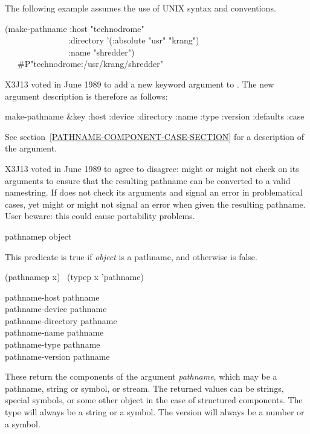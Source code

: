 \begin{newer}
The following example assumes the use of UNIX syntax and conventions.
\begin{lisp}
(make-pathname :host "technodrome" \\
~~~~~~~~~~~~~~~:directory '(:absolute "usr" "krang") \\
~~~~~~~~~~~~~~~:name "shredder") \\
~~\EV\ \#P"technodrome:/usr/krang/shredder"
\end{lisp}
X3J13 voted in June 1989  to add a new keyword
argument  to .  The new argument description
is therefore as follows:

\begin{defun}[Function]
make-pathname &key :host :device :directory :name :type :version :defaults :case

See section~\ref{PATHNAME-COMPONENT-CASE-SECTION} for a description
of the  argument.

X3J13 voted in June 1989  to agree to disagree:
 might or might not check
on its arguments to ensure that the resulting pathname can be converted to
a valid namestring.  If  does not check its arguments
and signal an error in problematical cases,
 yet might or might not signal an error when given the resulting
pathname.  User beware: this could cause portability problems.
\end{defun}
\end{newer}

\begin{defun}[Function]
pathnamep object

This predicate is true if \emph{object} is a pathname, and otherwise is false.
\begin{lisp}
(pathnamep x) \EQ\ (typep x 'pathname)
\end{lisp}
\end{defun}

\begin{obsolete}
\begin{defun}[Function]
pathname-host pathname \\
pathname-device pathname \\
pathname-directory pathname \\
pathname-name pathname \\
pathname-type pathname \\
pathname-version pathname

These return the components of the argument \emph{pathname}, which may be a
pathname, string or symbol, or stream.
The returned values can be strings, special
symbols, or some other object in the case of structured components.  The
type will always be a string or a symbol.  The version will always be a
number or a symbol.
\end{defun}
\end{obsolete}

